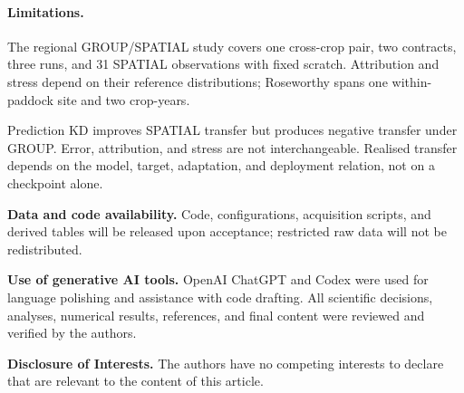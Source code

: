 \documentclass[runningheads]{venue/lncs/llncs}
\begin{document}
\paragraph{Limitations.} The regional GROUP/SPATIAL study covers one cross-crop pair, two contracts, three runs, and 31 SPATIAL observations with fixed scratch. Attribution and stress depend on their reference distributions; Roseworthy spans one within-paddock site and two crop-years.

Prediction KD improves SPATIAL transfer but produces negative transfer under GROUP. Error, attribution, and stress are not interchangeable. Realised transfer depends on the model, target, adaptation, and deployment relation, not on a checkpoint alone.

\noindent\textbf{Data and code availability.} Code, configurations, acquisition scripts, and derived tables will be released upon acceptance; restricted raw data will not be redistributed.

\noindent\textbf{Use of generative AI tools.} OpenAI ChatGPT and Codex were used for language polishing and assistance with code drafting. All scientific decisions, analyses, numerical results, references, and final content were reviewed and verified by the authors.

\noindent\textbf{Disclosure of Interests.} The authors have no competing interests to declare that are relevant to the content of this article.



\end{document}
